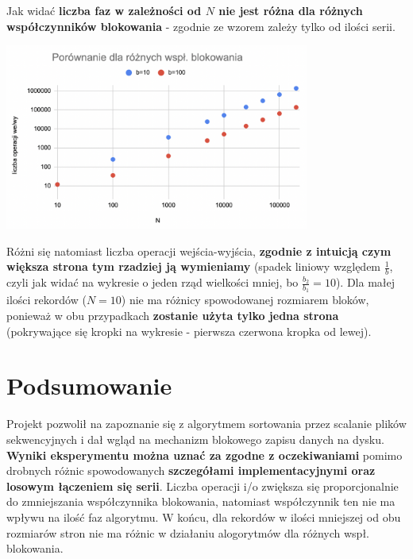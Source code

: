 \documentclass{article}
\begin{document}
Jak widać \textbf{liczba faz w zależności od 
$N$ nie jest różna dla różnych współczynników blokowania} - zgodnie ze wzorem zależy tylko od ilości serii.
\begin{center}
\includegraphics[width=10cm]{b}
\end{center}
Różni się natomiast liczba operacji wejścia-wyjścia, \textbf{zgodnie z intuicją czym większa
strona tym rzadziej ją wymieniamy} (spadek liniowy względem $\frac{1}{b}$, czyli jak widać na wykresie o jeden rząd wielkości mniej, bo $\frac{b_2}{b_1} = 10$). Dla małej ilości rekordów ($N=10$) nie ma różnicy spowodowanej
rozmiarem bloków, ponieważ w obu przypadkach \textbf{zostanie użyta tylko jedna strona} (pokrywające się 
kropki na wykresie - pierwsza czerwona kropka od lewej).
\section{Podsumowanie}
Projekt pozwolił na zapoznanie się z algorytmem sortowania przez scalanie plików sekwencyjnych i dał 
wgląd na mechanizm blokowego zapisu danych na dysku. \textbf{Wyniki eksperymentu można uznać za zgodne z oczekiwaniami} pomimo drobnych różnic spowodowanych \textbf{szczegółami implementacyjnymi oraz losowym
łączeniem się serii}.  Liczba operacji i/o zwiększa się proporcjonalnie do zmniejszania współczynnika blokowania, natomiast współczynnik ten nie ma wpływu na ilość faz algorytmu.  W końcu, dla rekordów w ilości 
mniejszej od obu rozmiarów stron  nie ma różnic w działaniu alogorytmów dla różnych wspł.  blokowania.
\end{document}
